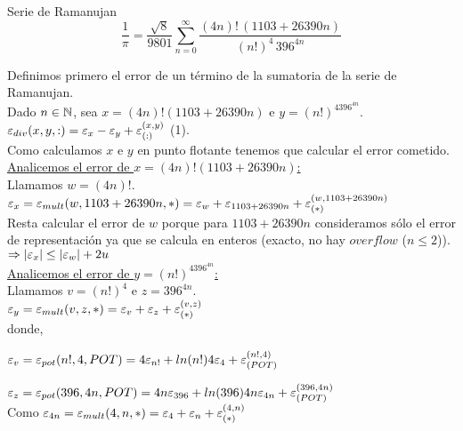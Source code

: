 \begin{subsection}{Serie de Ramanujan}
	\begin{equation*}
		\frac{1}{\pi} = \frac{\sqrt{8}}{9801} \sum_{n=0}^{\infty} \frac{(4n)! \, (1103 + 26390 n)}{(n!)^4 \, 396^{4n}}
    \end{equation*}
	
	\pa
	
	Definimos primero el error de un término de la sumatoria de la serie de Ramanujan.\\

	Dado $n \in \mathbb{N}$, sea $x=(4n)!(1103+26390n)$ e $y=(n!)^4396^{4n}$.\\
	
	$\varepsilon _{div}({x,y,:}) = \varepsilon _{x} - \varepsilon _{y} + \varepsilon _{({:})}^{({x,y})}$ (1).\\
	
	Como calculamos $x$ e $y$ en punto flotante tenemos que calcular el error cometido.\\
	
	\underline{Analicemos el error de $x=(4n)!(1103+26390n)$:}\\
	
	Llamamos $w=(4n)!$.\\

	$\varepsilon _{x} = \varepsilon _{mult}({w,1103+26390n,*}) = \varepsilon _{w}+\varepsilon _{1103+26390n}+\varepsilon _{({*})}^{({w,1103+26390n})}$\\
	
	Resta calcular el error de $w$ porque para $1103+26390n$ consideramos sólo el error de representación ya que se calcula en enteros (exacto, no hay $overflow$ ($n \leq 2$)).\\
	
	$\Rightarrow \left|\varepsilon _{x}\right| \leq \left|\varepsilon _{w}\right| + 2u$\\
	
	\underline{Analicemos el error de $y=(n!)^4396^{4n}$:}\\
	
	Llamamos $v=(n!)^4$ e $z=396^{4n}$.\\
	
	$\varepsilon _{y} = \varepsilon _{mult}({v,z,*}) = {\varepsilon _{v}+\varepsilon _{z}+\varepsilon _{({*})}^{({v,z})}}$\\
	
	donde,
	
	$\varepsilon _{v} = \varepsilon _{pot}({n!,4,POT}) = 4\varepsilon _{n!} + ln(n!) 4\varepsilon _{4} + \varepsilon _{({POT})}^{({n!,4})}$
	
	$\varepsilon _{z} = \varepsilon _{pot}({396,4n,POT}) = 4n\varepsilon _{396} + ln(396) 4n\varepsilon _{4n} + \varepsilon _{({POT})}^{({396,4n})}$\\
	
	Como $\varepsilon _{4n} = \varepsilon _{mult}({4,n,*}) = \varepsilon _{4} + \varepsilon _{n} + \varepsilon _{({*})}^{({4,n})}$\\
	

\end{subsection}
